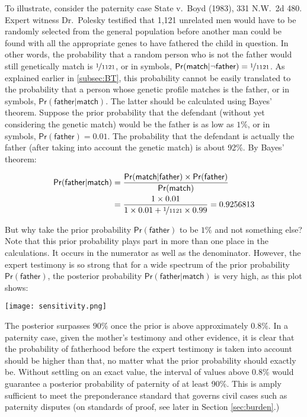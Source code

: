 \documentclass{article}
\newcommand{\pr}{\mathsf{Pr}}
\begin{document}
To illustrate, consider the paternity case State v.\ Boyd (1983), 331 N.W.\ 2d 480. Expert witness Dr.\ Polesky testified  that 1,121 unrelated men would have to be randomly selected from the general population before another man could be found with all the appropriate genes to have fathered the child in question. In other words, the  probability that a random person who is not the father would still genetically match is $\nicefrac{1}{1121}$, or in symbols, 
$\pr(\textsf{match}\vert \neg \textsf{father})=\nicefrac{1}{1121}$. As explained earlier in  \ref{subsec:BT}, this probability cannot be easily translated to the probability that a person whose genetic profile matches is  the father, or in symbols, $\pr(\textsf{father}\vert \textsf{match})$. The latter should be calculated using Bayes' theorem. %
Suppose the prior probability that the defendant (without yet considering 
the genetic match) would be the father is as low as $1\%$,  or in symbols,  $\pr(\textsf{father})=0.01$. 
The probability that the defendant is actually the father (after taking into account the genetic match) is 
about 92\%. By Bayes' theorem:

\begin{align*}
\pr(\textsf{father}\vert \textsf{match}) & = 
	\frac{
		\pr(\textsf{match}\vert \textsf{father}) \times \pr(\textsf{father})
		}
		{
		\pr(\textsf{match})
		} \\ &=
	\frac{
		1 \times  0.01
	}
	{
		1 \times 0.01 + \nicefrac{1}{1121} \times 0.99
		}	= 0.9256813
	\end{align*}

\noindent But why take the prior probability $\pr(\textsf{father})$ to be $1\%$ and not something else?
Note that this prior probability plays part in more than one place in the calculations. It occurs in the numerator as well as the denominator. 
%
However, the expert testimony is so strong that for a wide spectrum of the prior probability $\pr(\textsf{father})$, the posterior probability $\pr(\textsf{father} \vert \textsf{match})$ is very high, as this plot shows:
%
\begin{center}
	\texttt{[image: sensitivity.png]}
\end{center}
%
\noindent The posterior surpasses $90\%$ once the prior is above approximately $0.8\%$. In a paternity case, given the mother's testimony and other evidence, it is clear that the probability of fatherhood before the expert testimony is taken into account should be higher than that, no matter what the prior probability should exactly be. Without settling on an exact value, the interval of values above 0.8\% would guarantee a posterior probability of paternity of at least 90\%. This is amply sufficient to meet the preponderance standard that governs civil cases such as paternity disputes (on standards of proof, see later in Section \ref{sec:burden}.)
\end{document}
